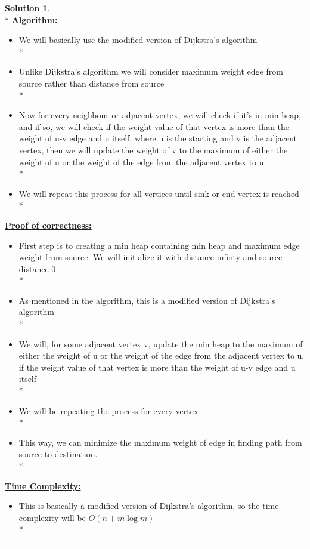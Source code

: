 \documentclass{article}
\theoremstyle{definition}
\def\fline{\rule{0.75\linewidth}{0.5pt}}
\newcommand{\finishline}{\vspace{-15pt}\begin{center}\fline\end{center}}
\newtheorem*{solution*}{Solution}
\newenvironment{solution}{\begin{solution*}}{{\finishline} \end{solution*}}
\begin{document}
\begin{solution}
	\hfill \bigskip\\*
	\textbf{\underline{Algorithm:}}
		\begin{itemize}
			\item We will basically use the modified version of Dijkstra's algorithm \\*
			
			\item Unlike Dijkstra's algorithm we will consider maximum weight edge from source rather than distance from source\\*
			\item Now for every neighbour or adjacent vertex, we will check if it's in min heap, and if so, we will check if the weight value of that vertex is more than the weight of u-v edge and u itself, where u is the starting and v is the adjacent vertex, then we will update the weight of v to the maximum of either the weight of u or the weight of the edge from the adjacent vertex to u  \\*
			\item We will repeat this process for all vertices until sink or end vertex is reached \\*
		\end{itemize} 		
	\textbf{\underline{Proof of correctness:}} 	
		\begin{itemize}
			\item  First step is to creating a min heap containing min heap and maximum edge weight from source. We will initialize it with distance infinty and source distance 0\\*
			\item As mentioned in the algorithm, this is a modified version of Dijkstra's algorithm\\*
			\item We will, for some adjacent vertex v, update the min heap to the maximum of either the weight of u or the weight of the edge from the adjacent vertex to u, if the weight value of that vertex is more than the weight of u-v edge and u itself \\*
			\item We will be repeating the process for every vertex \\*
			\item This way, we can minimize the maximum weight of edge in finding path from source to destination.\\*
		\end{itemize} 
	\textbf{\underline{Time Complexity:}} 
		\begin{itemize}
			\item This is basically a modified version of Dijkstra's algorithm, so the time complexity will be $O(n+m\log{m})$\\*
		\end{itemize} 
\end{solution}
\end{document}
